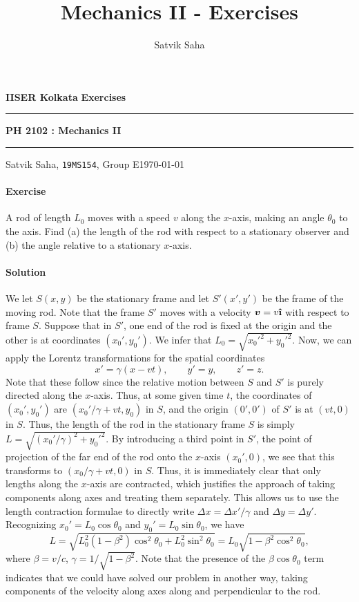 \documentclass[10pt]{article}
\title{Mechanics II - Exercises}
\author{Satvik Saha}
\date{}
\let\vec\boldsymbol
\newcommand{\uveci}{{\bm{\hat{\textnormal{\bfseries\i}}}}}
\newcounter{prob}
\def\problem{\stepcounter{prob}\paragraph{Exercise \arabic{prob}}}
\def\solution{\paragraph{Solution}}
\begin{document}
        \par\textbf{IISER Kolkata} \hfill \textbf{Exercises}
        \vspace{3pt}
        \hrule
        \vspace{3pt}
        \begin{center}
                \LARGE{\textbf{PH 2102 : Mechanics II}}
        \end{center}
        \vspace{3pt}
        \hrule
        \vspace{3pt}
        Satvik Saha, \texttt{19MS154}, Group E\hfill\today
        \vspace{20pt}

        \problem A rod of length $L_0$ moves with a speed $v$ along the $x$-axis, making an angle $\theta_0$ to the axis. Find (a) the
        length of the rod with respect to a stationary observer and (b) the angle relative to a stationary $x$-axis.

        \solution We let $S(x, y)$ be the stationary frame and let $S'(x', y')$ be the frame of the moving rod.
        Note that the frame $S'$ moves with a velocity $\vec{v} = v\uveci$ with respect to frame $S$.
        Suppose that in $S'$, one end of the rod is fixed at the origin and the other is at coordinates $(x_0', y_0')$.
        We infer that $L_0 = \sqrt{x_0'^2 + y_0'^2}$. Now, we can apply the Lorentz transformations for the spatial coordinates
        \[
                x' = \gamma(x - vt), \qquad y' = y, \qquad z' = z.
        \]
        Note that these follow since the relative motion between $S$ and $S'$ is purely directed along the $x$-axis.
        Thus, at some given time $t$, the coordinates of $(x_0', y_0')$ are $(x_0'/\gamma + vt, y_0)$ in $S$, and the origin $(0', 0')$ of $S'$
        is at $(vt, 0)$ in $S$. Thus, the length of the rod in the stationary frame $S$ is simply $L = \sqrt{(x_0'/\gamma)^2 + y_0'^2}$.
        By introducing a third point in $S'$, the point of projection of the far end of the rod onto the $x$-axis $(x_0', 0)$, we
        see that this transforms to $(x_0 /\gamma + vt, 0)$ in $S$. Thus, it is immediately clear that only lengths along the $x$-axis
        are contracted, which justifies the approach of taking components along axes and treating them separately.
        This allows us to use the length contraction formulae to directly write $\Delta x = \Delta x' /\gamma$ and $\Delta y = \Delta y'$.
        Recognizing $x_0' = L_0\cos\theta_0$ and $y_0' = L_0\sin\theta_0$, we have
        \[
                L = \sqrt{L_0^2(1 - \beta^2)\cos^2\theta_0 + L_0^2\sin^2\theta_0} = L_0\sqrt{1 - \beta^2\cos^2\theta_0}, \tag{a}
        \]
        where $\beta = v /c$, $\gamma = 1 /\sqrt{1 - \beta^2}$. Note that the presence of the $\beta\cos\theta_0$ term indicates that
        we could have solved our problem in another way, taking components of the velocity along axes along and perpendicular to the rod. \\
\end{document}
